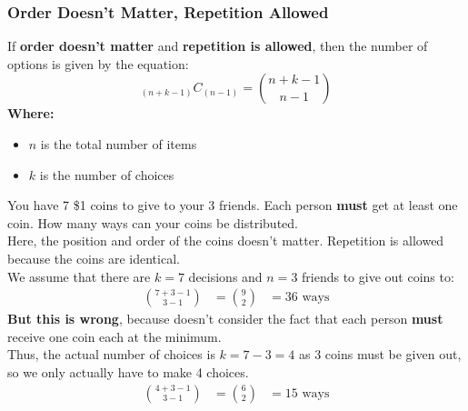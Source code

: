 \documentclass[12pt]{article}
\theoremstyle{definition}
\begin{document}
    \subsubsection{Order Doesn't Matter, Repetition Allowed}
    If \textbf{order doesn't matter} and \textbf{repetition is allowed}, then the number of options is given by the
    equation:
    \begin{equation*}
        _{(n+k-1)}C_{(n-1)} = \binom{n+k-1}{n-1}
    \end{equation*}
    \textbf{Where:}
    \begin{itemize}
        \item $n$ is the total number of items
        \item $k$ is the number of choices
    \end{itemize}

    \begin{example}
        You have 7 \$1 coins to give to your 3 friends. Each person \textbf{must} get at least one coin. How many ways
        can your coins be distributed. \\

        Here, the position and order of the coins doesn't matter. Repetition is allowed because the coins are
        identical. \\

        We assume that there are $k = 7$ decisions and $n = 3$ friends to give out coins to:
        \begin{align*}
            \binom{7+3-1}{3-1} &= \binom{9}{2}
            &= 36 \text{ ways}
        \end{align*}
        \textbf{But this is wrong}, because doesn't consider the fact that each person \textbf{must} receive one coin
        each at the minimum.\\

        Thus, the actual number of choices is $k = 7-3 = 4$ as 3 coins must be given out, so we only actually have to
        make 4 choices.
        \begin{align*}
            \binom{4+3-1}{3-1} &= \binom{6}{2}
            &= 15 \text{ ways} 
        \end{align*} 
    \end{example}
\end{document}
